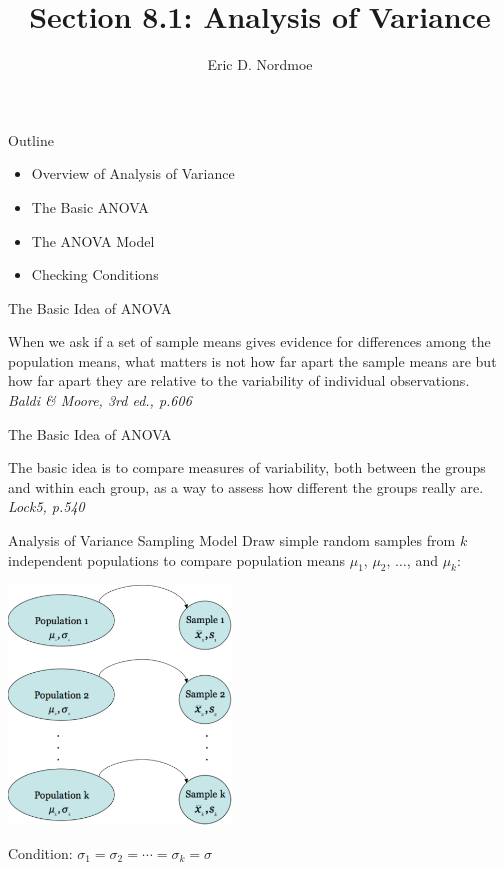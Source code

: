 \documentclass[t,xcolor=pdftex,dvipsnames,table,handout]{beamer}
\title{Section 8.1: Analysis of Variance} %
\subtitle{} %
\author{Eric D. Nordmoe}
\institute%
{Math 261\\
  Biostatistics\\
  Kalamazoo College}
\date{}
\newcommand{\bi}{\begin{itemize}}
\newcommand{\ei}{\end{itemize}}
\begin{document}
\begin{frame}
  \titlepage
\end{frame}

\begin{frame}{Outline}
\bi
    \item Overview of Analysis of Variance
    \item The Basic ANOVA
    \item The ANOVA Model
    \item Checking Conditions
\ei
\end{frame}
\begin{frame}{The Basic Idea of ANOVA}
\begin{block}{}

When we ask if a set of sample means gives evidence for \alert{differences
among the population means}, what matters is not how far apart the
sample  means are but how far apart they are \alert{relative to the
variability of individual observations}.\\[1ex]
\hfill{\emph{Baldi \& Moore, 3rd ed., p.606}}
\end{block}
\end{frame}
\begin{frame}{The Basic Idea of ANOVA}
\begin{block}{}
The basic idea is to compare measures of variability, both
    \alert{between} the groups and \alert{within} each group, as a way to assess how
    different the groups really are.\\[1ex]
\hfill{\emph{Lock5, p.540}}
\end{block}
\end{frame}
\begin{frame}{Analysis of Variance Sampling Model}
Draw \alert{simple random samples} from $k$ \alert{independent} populations to compare
population means $\mu_1$, $\mu_2$, $\ldots$, and $\mu_k$:
    \vspace{-1ex}
\begin{center}
\includegraphics[height=2.5in]{sampling_model.pdf}
\end{center}
\pause
 \vspace{-1ex} Condition: $\sigma_1=\sigma_2=\cdots=\sigma_k=\sigma$
\end{frame}
\end{document}

